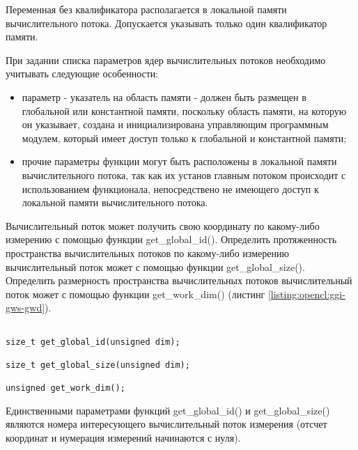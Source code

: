 		Переменная без квалификатора располагается в локальной памяти вычислительного потока. Допускается указывать только один квалификатор памяти.

		При задании списка параметров ядер вычислительных потоков необходимо учитывать следующие особенности:

		\begin{itemize}

			\item параметр - указатель на область памяти - должен быть размещен в глобальной или константной памяти, поскольку область памяти, на которую он указывает, создана и инициализирована управляющим программным модулем, который имеет доступ только к глобальной и константной памяти;

			\item прочие параметры функции могут быть расположены в локальной памяти вычислительного потока, так как их установ главным потоком происходит с использованием функционала, непосредствено не имеющего доступ к локальной памяти вычислительного потока.

		\end{itemize}


		Вычислительный поток может получить свою координату по какому-либо измерению с помощью функции get\_global\_id(). Определить протяженность пространства вычислительных потоков по какому-либо измерению вычислительный поток может с помощью функции get\_global\_size(). Определить размерность пространства вычислительных потоков вычислительный поток может с помощью функции get\_work\_dim() (листинг \ref{listing:opencl:ggi-gws-gwd}).

\begin{lstlisting}

size_t get_global_id(unsigned dim);

size_t get_global_size(unsigned dim);

unsigned get_work_dim();

\end{lstlisting}
\mylistingend

		Единственными параметрами функций get\_global\_id() и get\_global\_size() являются номера интересующего вычислительный поток измерения (отсчет координат и нумерация измерений начинаются с нуля).


